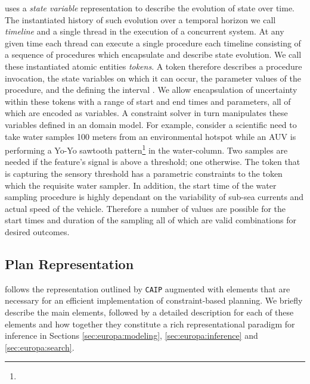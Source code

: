 \eu uses a \emph{state variable} representation
\cite{mus94,jonsson00,py10} to describe the evolution of state over
time. The instantiated history of such  evolution over a
temporal horizon we call  \emph{timeline} and
 a single thread in the execution of a
concurrent system. At any given time each thread can execute a single
procedure each timeline consisting of a sequence of
procedures which encapsulate and describe state evolution. We call
these instantiated atomic entities \emph{tokens}.  A token therefore
describes a procedure invocation, the state variables on which it can
occur, the parameter values of the procedure, and the
 defining the interval . We allow encapsulation of
uncertainty within these tokens with a range of start and end times
and parameters, all of which are encoded as variables. A constraint
solver in turn manipulates these variables defined in an \eu domain
model. For example, consider a scientific need to take water samples
100 meters from an environmental hotspot while an AUV is performing a
Yo-Yo sawtooth pattern\footnote{}  in the
water-column. Two samples are needed if the feature's signal is above
a threshold; one otherwise. The token that is capturing the sensory
threshold has a parametric constraints to the token which
 the requisite water sampler. In addition, the
start time of the water sampling procedure is highly dependant on the
variability of sub-sea currents and actual speed of the
vehicle. Therefore a number of values are possible for the start times
and duration of the sampling all of which are valid combinations for
desired outcomes.

\subsection{\eu Plan Representation}
\label{sec:europa:pr}

\eu follows the representation outlined by \texttt{CAIP} augmented
with elements that are necessary for an efficient implementation of
constraint-based planning. We briefly describe the main elements,
followed by a detailed description for each of these elements and how
together they constitute a rich representational paradigm for
inference in Sections \ref{sec:europa:modeling},
\ref{sec:europa:inference} and \ref{sec:europa:search}.

